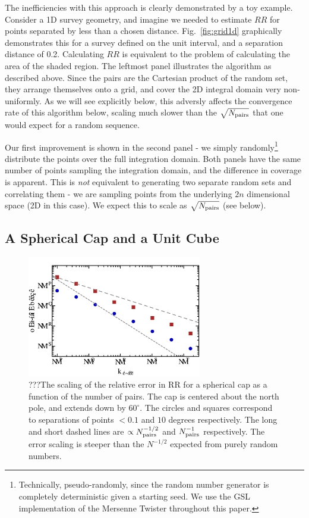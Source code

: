 \documentclass[usenatbib]{mn2e}
\begin{document}
The inefficiencies with this approach is clearly demonstrated by a toy example.
Consider a 1D survey geometry, and imagine we
needed to estimate $RR$ for points separated by less than a chosen distance. 
Fig.~\ref{fig:grid1d} graphically demonstrates this for a survey defined on
the unit interval, and a separation distance of 0.2. Calculating $RR$ is
equivalent to the problem of calculating the area of the shaded region. The
leftmost panel illustrates the algorithm as described above. Since the pairs are
the Cartesian product of the random set, they arrange themselves onto a grid,
and cover the 2D integral domain very non-uniformly. As we will see explicitly
below, this adversly affects the convergence rate of this algorithm below,
scaling much slower than the $\sqrt{N_{\rm pairs}}$ that one would expect for a
random sequence. 

Our first improvement is shown in the second panel - we simply
randomly\footnote{Technically, pseudo-randomly, since the random number
generator is completely deterministic given a starting seed. We use the GSL
implementation of the Mersenne Twister throughout this paper.} distribute the
points over the full integration domain.
Both panels have the same number of points sampling the integration domain, and the difference in
coverage is apparent. This is {\it not} equivalent to generating two separate
random sets and correlating them - we are sampling points from the underlying $2n$ dimensional 
space (2D in this case). We expect this to scale as
$\sqrt{N_{\rm pairs}}$ (see below). 

\subsection{A Spherical Cap and a Unit Cube}

\lipsum[1-3]

\begin{figure}
\includegraphics[width=3in]{plots/cap2d}
\caption{???The scaling of the relative error in RR for a spherical cap as a function of the number
of pairs. The cap is centered about the north pole, and extends down by
$60^{\circ}$. The circles and squares correspond to separations of points $<
0.1$ and $10$ degrees respectively. The long and short dashed lines are
$\propto N_{\rm pairs}^{-1/2}$ and $N_{\rm pairs}^{-1}$ respectively. The error
scaling is steeper than the $N^{-1/2}$ expected from purely random numbers.}
\label{fig:cap2d}
\end{figure}
\end{document}
